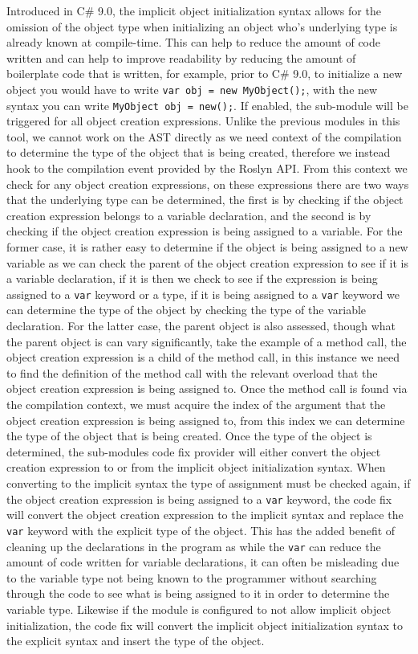 Introduced in C\# 9.0, the implicit object initialization syntax allows for the omission of the object type when initializing an object who's underlying type is already known at compile-time. This can help to reduce the amount of code written and can help to improve readability by reducing the amount of boilerplate code that is written, for example, prior to C\# 9.0, to initialize a new object you would have to write \texttt{var obj = new MyObject();}, with the new syntax you can write \texttt{MyObject obj = new();}.
If enabled, the sub-module will be triggered for all object creation expressions. Unlike the previous modules in this tool, we cannot work on the AST directly as we need context of the compilation to determine the type of the object that is being created, therefore we instead hook to the compilation event provided by the Roslyn API. From this context we check for any object creation expressions, on these expressions there are two ways that the underlying type can be determined, the first is by checking if the object creation expression belongs to a variable declaration, and the second is by checking if the object creation expression is being assigned to a variable.
For the former case, it is rather easy to determine if the object is being assigned to a new variable as we can check the parent of the object creation expression to see if it is a variable declaration, if it is then we check to see if the expression is being assigned to a \texttt{var} keyword or a type, if it is being assigned to a \texttt{var} keyword we can determine the type of the object by checking the type of the variable declaration. For the latter case, the parent object is also assessed, though what the parent object is can vary significantly, take the example of a method call, the object creation expression is a child of the method call, in this instance we need to find the definition of the method call with the relevant overload that the object creation expression is being assigned to. Once the method call is found via the compilation context, we must acquire the index of the argument that the object creation expression is being assigned to, from this index we can determine the type of the object that is being created.
Once the type of the object is determined, the sub-modules code fix provider will either convert the object creation expression to or from the implicit object initialization syntax. When converting to the implicit syntax the type of assignment must be checked again, if the object creation expression is being assigned to a \texttt{var} keyword, the code fix will convert the object creation expression to the implicit syntax and replace the \texttt{var} keyword with the explicit type of the object. This has the added benefit of cleaning up the declarations in the program as while the \texttt{var} can reduce the amount of code written for variable declarations, it can often be misleading due to the variable type not being known to the programmer without searching through the code to see what is being assigned to it in order to determine the variable type. Likewise if the module is configured to not allow implicit object initialization, the code fix will convert the implicit object initialization syntax to the explicit syntax and insert the type of the object.
